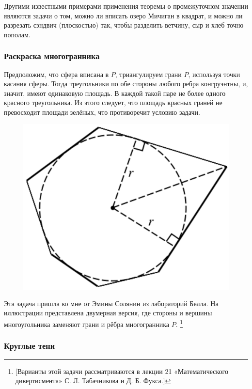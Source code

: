 Другими  известными примерами применения теоремы о промежуточном значении являются задачи о том, можно ли вписать озеро Мичиган в квадрат, и можно ли  разрезать сэндвич (плоскостью) так, чтобы разделить ветчину, сыр и хлеб точно пополам.

\subsubsection*{Раскраска многогранника}%

Предположим, что сфера вписана в $P$, триангулируем грани $P$, используя точки касания сферы.
Тогда треугольники по обе стороны любого ребра конгруэнтны, и, значит, имеют одинаковую площадь.
В каждой такой паре не более одного красного треугольника.
Из этого следует, что площадь красных граней не превосходит площади зелёных, что противоречит условию задачи.\heart

\begin{figure}[h!]
\centering
\includegraphics[scale=0.5]{Figs/Geometry/polygon}
\end{figure}

Эта задача пришла ко мне от Эмины Солянин %
из лабораторий Белла.
На иллюстрации представлена двумерная версия, где стороны и вершины многоугольника заменяют грани и рёбра многогранника $P$.%
\footnote{[Варианты этой задачи рассматриваются в лекции 21 «Математического дивертисмента» С. Л. Табачникова и Д. Б. Фукса.]}

\subsubsection*{Круглые тени}%

